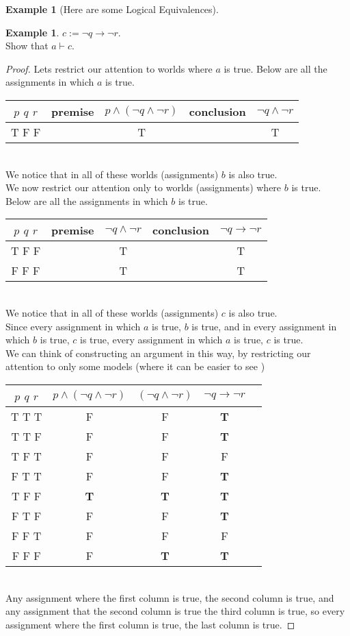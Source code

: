 \documentclass[letterpaper,10pt]{article}
\theoremstyle{plain}
\theoremstyle{definition}
\newtheorem{exmp}[thm]{Example}
\theoremstyle{remark}
\providecommand{\land}{\ensuremath{\wedge}}
\begin{document}
\begin{exmp}[Here are some Logical Equivalences]
\begin{exmp}
$c:=\lnot q \to \lnot r$.\\
Show that
$a\vdash c$.
\begin{proof}
Lets restrict our attention to worlds where $a$ is true. Below are all the assignments in which $a$ is true.\\
\begin{tabular}{ | c | c | c |c |c |} 
  \hline
 $p$ $q$ $r$ & premise & $p \land (\lnot q \land \lnot r)$& conclusion & $\lnot q \land \lnot r$\\
 \hline
  T F F  &&T &&T\\ 
 \hline
\end{tabular}\\
We notice that in all of these worlds (assignments) $b$ is also true.\\
We now restrict our attention only to worlds (assignments) where $b$ is true.\\
Below are all the assignments in which $b$ is true.\\
\begin{tabular}{ | c | c | c |c |c |} 
  \hline
 $p$ $q$ $r$ & premise & $\lnot q \land \lnot r$& conclusion & $\lnot q \to \lnot r$\\
 \hline
  T F F  &&T &&T\\
  F F F  &&T &&T\\ 
 \hline
\end{tabular}\\
We notice that in all of these worlds (assignments) $c$ is also true.\\
Since every assignment in which $a$ is true, $b$ is true, and in every assignment in which $b$ is true, $c$ is true, every assignment in which $a$ is true, $c$ is true.\\
We can think of constructing an argument in this way, by restricting our attention to only some models (where it can be easier to see )\\

\begin{tabular}{ | c | c | c |c |c |} 
  \hline
 $p$ $q$ $r$ & $p \land (\lnot q \land \lnot r)$&$(\lnot q \land \lnot r)$&$\lnot q \to \lnot r$\\
 \hline
  T T T  &F &F&\textbf{T}\\
  T T F  &F &F&\textbf{T}\\
  T F T  &F &F&F\\
  F T T  &F &F&\textbf{T}\\
  T F F  &\textbf{T} &\textbf{T}&\textbf{T}\\ 
  F T F  &F &F&\textbf{T}\\ 
  F F T  &F &F&F\\ 
  F F F  &F &\textbf{T}&\textbf{T}\\ 
 \hline
\end{tabular}\\
Any assignment where the first column is true, the second column is true, and any assignment that the second column is true the third column is true, so every assignment where the first column is true, the last column is true.
\end{proof}
\end{exmp}


\end{exmp}
\end{document}

